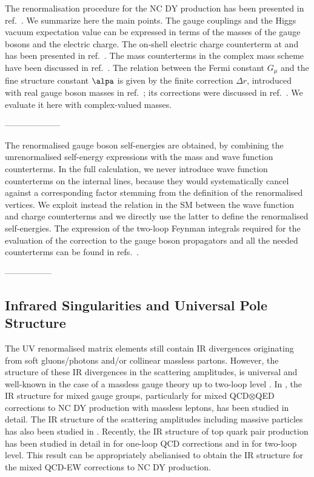 \documentclass[a4paper]{jpconf}
\begin{document}
The \oaas renormalisation procedure for the NC DY production has been presented in ref.~\cite{Dittmaier:2020vra}.
We summarize here the main points.
% 
The gauge couplings and the Higgs vacuum expectation value can be expressed in terms of
the masses of the gauge bosons and the electric charge. 
% 
The on-shell electric charge counterterm at \oaa and \oaas has been presented in ref.~\cite{Degrassi:2003rw}.
The mass counterterms in the complex mass scheme \cite{Denner:2005fg} have been discussed in ref.~\cite{Dittmaier:2020vra}.
% 
The relation between the Fermi constant $G_\mu$ and the fine structure constant $\alpa$
is given by the finite correction $\Delta r$,
introduced with real gauge boson masses in ref.~\cite{Sirlin:1980nh};
its \oaas corrections were discussed in ref.~\cite{Kniehl:1989yc,Djouadi:1993ss}. 
We evaluate it here with complex-valued masses.

--------------------

The renormalised gauge boson self-energies are obtained,
by combining the unrenormalised self-energy expressions with the mass and wave function counterterms.
In the full calculation, we never introduce wave function counterterms on the internal lines,
because they would systematically cancel
against a corresponding factor stemming from the definition of the renormalised vertices.
We exploit instead the relation in the SM
between the wave function and charge counterterms \cite{Denner:2019vbn}
and we directly use the latter to define the renormalised self-energies.
% 
The expression of the two-loop Feynman integrals required for the evaluation of the
\oaas correction to the gauge boson propagators and all the needed counterterms
can be found in refs.~\cite{Kniehl:1989yc,Djouadi:1993ss,Dittmaier:2020vra}.

-----------------

\subsection{Infrared Singularities and Universal Pole Structure}

The UV renormalised matrix elements still contain IR divergences
originating from soft gluons/photons and/or collinear massless partons.
% 
However, the structure of these IR divergences in the scattering amplitudes, is universal
and well-known in the case of a massless gauge theory up to two-loop level
\cite{Catani:1998bh,Sterman:2002qn,Becher:2009cu,Gardi:2009qi}.
% 
In \cite{Kilgore:2011pa,Kilgore:2013uta}, the IR structure for mixed gauge groups, 
particularly for mixed QCD$\otimes$QED corrections to NC DY production with massless leptons, 
has been studied in detail.
% 
The IR structure of the scattering amplitudes including massive particles
has also been studied in \cite{Mitov:2006xs,Becher:2007cu,Becher:2009kw,Ahmed:2017gyt,Blumlein:2018tmz}.
Recently, the IR structure of top quark pair production has been studied in detail
in \cite{Catani:2014qha} for one-loop QCD corrections
and in \cite{Catani:2019iny,Catani:2019hip,Catani:2020kkl} for two-loop level.
% 
This result can be appropriately abelianised \cite{Buonocore:2019puv} to obtain
the IR structure for the mixed QCD-EW corrections to NC DY production.
\end{document}
